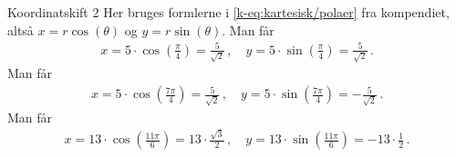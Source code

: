\begin{opgave}[1]{Koordinatskift 2}
Her bruges formlerne i \eqref{k-eq:kartesisk/polaer} fra kompendiet, altså $x = r \cos(\theta)$ og $y = r \sin(\theta)$.
\opg Man får
\begin{align*}
x = 5 \cdot \cos\left( \frac{\pi}{4} \right) = \frac{5}{\sqrt{2}} \, , \quad y = 5 \cdot \sin\left(\frac{\pi}{4}\right) = \frac{5}{\sqrt{2}} \, .
\end{align*}
\opg Man får
\begin{align*}
x = 5 \cdot \cos\left(\frac{7\pi}{4}\right) =  \frac{5}{\sqrt{2}} \, , \quad y = 5 \cdot \sin\left(\frac{7\pi}{4}\right) = - \frac{5}{\sqrt{2}} \, .
\end{align*}
\opg Man får
\begin{align*}
x = 13 \cdot \cos\left(\frac{11\pi}{6}\right) = 13 \cdot \frac{\sqrt{3}}{2} \, , \quad y = 13 \cdot \sin\left(\frac{11\pi}{6}\right) =  -13 \cdot \frac{1}{2} \, .
\end{align*}
\end{opgave}
